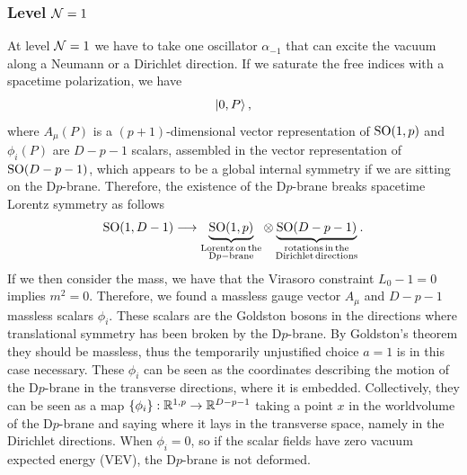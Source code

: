 \subsubsection{Level \texorpdfstring{$\mathcal{N} = 1$}{N = 1}}
At level $\mathcal{N} = 1$ we have to take one oscillator $\alpha_{-1}$ that can excite the vacuum along a Neumann or a Dirichlet direction. If we saturate the free indices with a spacetime polarization, we have 
\begin{equation}
    [A_\mu(P)\alpha_{-1}^\mu + \phi_i(P)\alpha^i_{-1}]\ket{0,P},
\end{equation}
where $A_\mu(P)$ is a $(p + 1)$-dimensional vector representation of $\mathrm{SO}(1,p)$ and $\phi_i(P)$ are $D - p - 1$ scalars, assembled in the vector representation of $\mathrm{SO}(D - p - 1)$, which appears to be a global internal symmetry if we are sitting on the D$p$-brane. Therefore, the existence of the D$p$-brane breaks spacetime Lorentz symmetry as follows
\begin{equation}
    \mathrm{SO}(1, D - 1) \longrightarrow \underbrace{\mathrm{SO}(1,p)}_{\substack{\mathrm{Lorentz\,on\,the} \\ \mathrm{D}p\mathrm{-brane}}} \otimes \underbrace{\mathrm{SO}(D - p - 1)}_{\substack{\mathrm{rotations\,in\,the} \\ \mathrm{Dirichlet\,directions}}}.
\end{equation}
If we then consider the mass, we have that the Virasoro constraint $L_0 - 1 = 0$ implies $m^2 = 0$. Therefore, we found a massless gauge vector $A_\mu$ and $D - p - 1$ massless scalars $\phi_i$. These scalars are the Goldston bosons in the directions where translational symmetry has been broken by the D$p$-brane. By Goldston's theorem they should be massless, thus the temporarily unjustified choice $a = 1$ is in this case necessary. These $\phi_i$ can be seen as the coordinates describing the motion of the D$p$-brane in the transverse directions, where it is embedded. Collectively, they can be seen as a map $\{\phi_i\} : \mathbb{R}^{1,p} \to \mathbb{R}^{D - p - 1}$ taking a point $x$ in the worldvolume of the D$p$-brane and saying where it lays in the transverse space, namely in the Dirichlet directions. When $\phi_i = 0$, so if the scalar fields have zero vacuum expected energy (VEV), the D$p$-brane is not deformed. 


